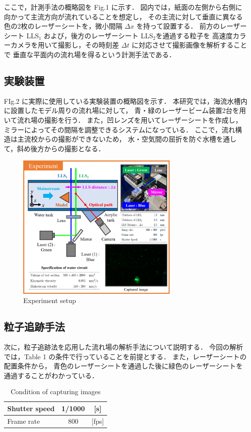 \documentclass[twocolumn,a4j]{jsarticle}
\begin{document}
\newpage
ここで，計測手法の概略図を Fig.1 に示す．
図内では，紙面の左側から右側に向かって主流方向が流れていることを想定し，
その主流に対して垂直に異なる色の2枚のレーザーシートを，微小間隔 $\Delta x$ を持って設置する．
前方のレーザーシート LLS$_1$ および，後方のレーザーシート LLS$_2$を通過する粒子を
高速度カラーカメラを用いて撮影し，その時刻差 $\Delta t$ に対応させて撮影画像を解析することで
垂直な平面内の流れ場を得るという計測手法である．

\subsection{実験装置}

FIg.2 に実際に使用している実験装置の概略図を示す．
本研究では，海流水槽内に設置したモデル周りの流れ場に対して，
青・緑のレーザービーム装置2台を用いて流れ場の撮影を行う．
また，凹レンズを用いてレーザーシートを作成し，
ミラーによってその間隔を調整できるシステムになっている．
ここで，流れ構造は主流校からの撮影ができないため，
水・空気間の屈折を防ぐ水槽を通して，斜め後方からの撮影となる．

\begin{figure}[htbp]
	\centering
	\includegraphics[keepaspectratio, width=80mm]{../images/experiment.png}
	\caption{Experiment setup}
\end{figure}

\subsection{粒子追跡手法}
次に，粒子追跡法を応用した流れ場の解析手法について説明する．
今回の解析では，Table 1 の条件で行っていることを前提とする．
また，レーザーシートの配置条件から，
青色のレーザーシートを通過した後に緑色のレーザーシートを通過することがわかっている．
\begin{table}[hbtp]
	\centering
	\caption{Condition of capturing images}
	\begin{tabular}{l c c}
		\hline
		Shutter speed & 1/1000 & [s]   \\ \hline
		Frame rate    & 800    & [fps] \\ \hline
	\end{tabular}
\end{table}
\end{document}
